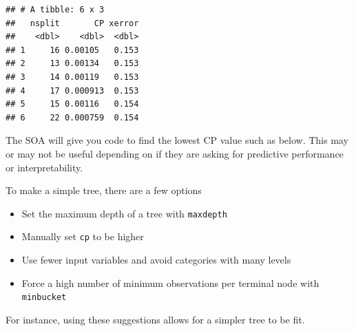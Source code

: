 \documentclass[
  openany]{book}
\newenvironment{Shaded}{\begin{snugshade}}{\end{snugshade}}
\newcommand{\DataTypeTok}[1]{\textcolor[rgb]{0.13,0.29,0.53}{#1}}
\newcommand{\KeywordTok}[1]{\textcolor[rgb]{0.13,0.29,0.53}{\textbf{#1}}}
\newcommand{\NormalTok}[1]{#1}
\newcommand{\OperatorTok}[1]{\textcolor[rgb]{0.81,0.36,0.00}{\textbf{#1}}}
\newcommand{\StringTok}[1]{\textcolor[rgb]{0.31,0.60,0.02}{#1}}
\providecommand{\tightlist}{%
  \setlength{\itemsep}{0pt}\setlength{\parskip}{0pt}}
\begin{document}
\begin{verbatim}
## # A tibble: 6 x 3
##   nsplit       CP xerror
##    <dbl>    <dbl>  <dbl>
## 1     16 0.00105   0.153
## 2     13 0.00134   0.153
## 3     14 0.00119   0.153
## 4     17 0.000913  0.153
## 5     15 0.00116   0.154
## 6     22 0.000759  0.154
\end{verbatim}

The SOA will give you code to find the lowest CP value such as below. This may or may not be useful depending on if they are asking for predictive performance or interpretability.

\begin{Shaded}
\end{Shaded}

To make a simple tree, there are a few options

\begin{itemize}
\tightlist
\item
  Set the maximum depth of a tree with \texttt{maxdepth}
\item
  Manually set \texttt{cp} to be higher
\item
  Use fewer input variables and avoid categories with many levels
\item
  Force a high number of minimum observations per terminal node with \texttt{minbucket}
\end{itemize}

For instance, using these suggestions allows for a simpler tree to be fit.
\end{document}
